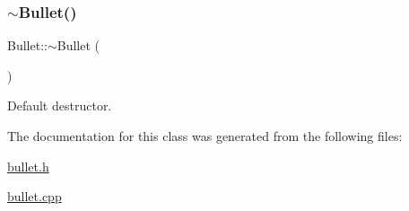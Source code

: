\subsubsection{\texorpdfstring{$\sim$\+Bullet()}{~Bullet()}}
{\footnotesize\ttfamily Bullet\+::$\sim$\+Bullet (\begin{DoxyParamCaption}{ }\end{DoxyParamCaption})\hspace{0.3cm}{\ttfamily [virtual]}}



Default destructor. 



The documentation for this class was generated from the following files\+:\begin{DoxyCompactItemize}
\item 
\hyperlink{bullet_8h}{bullet.\+h}\item 
\hyperlink{bullet_8cpp}{bullet.\+cpp}\end{DoxyCompactItemize}
